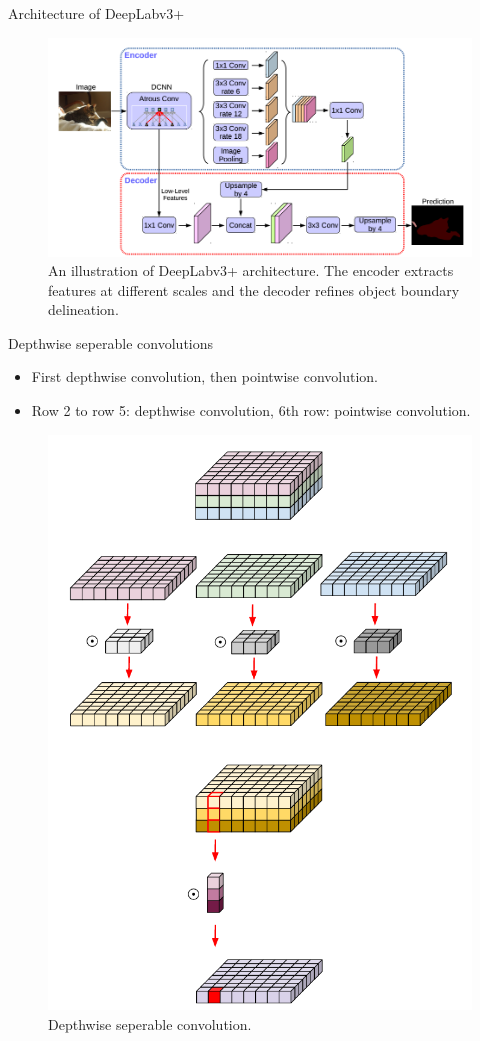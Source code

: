 \documentclass{beamer}
\begin{document}
\begin{frame}{Architecture of DeepLabv3+}
	
	\begin{figure}
		\centering
		\includegraphics[width=1\linewidth]{images/deepLabv4}
		\captionsetup{justification=centering,margin=0.2cm}
		\caption{An illustration of DeepLabv3+ architecture. The encoder extracts features at different scales and the decoder refines object boundary delineation.}
		\label{Fig:deepLabv4}
	\end{figure}

\end{frame}


\begin{frame}{Depthwise seperable convolutions}
	\begin{small}
	\begin{itemize}
		\item First depthwise convolution, then pointwise convolution.
		\item Row 2 to row 5: depthwise convolution, 6th row: pointwise convolution.
	\end{itemize}
	\end{small}
	 
	\begin{figure}
		\centering
		\includegraphics[width=.3\linewidth]{images/depthwise}
		\captionsetup{justification=centering,margin=0.2cm}
		\caption{Depthwise seperable convolution.}
		\label{Fig:depthwise}
	\end{figure}

\end{frame}
\end{document}
